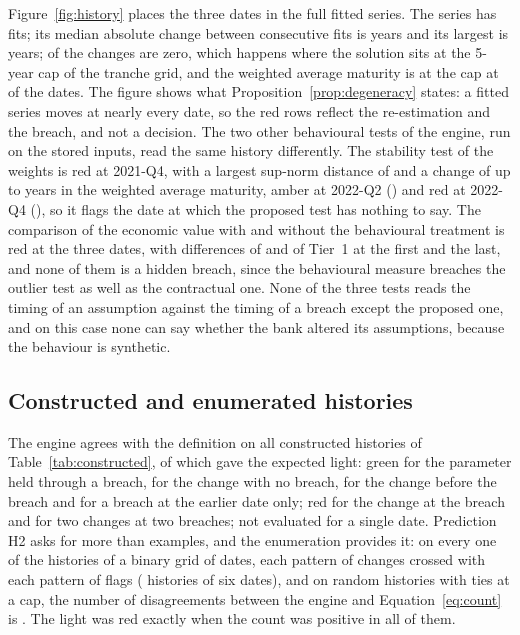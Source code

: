 Figure~\ref{fig:history} places the three dates in the full fitted series. The series has \realFits{} fits; its median absolute change between consecutive fits is \realMedianChange{} years and its largest is \realMaxChange{} years; \realZeroShare{} of the changes are zero, which happens where the solution sits at the 5-year cap of the tranche grid, and the weighted average maturity is at the cap at \realCapShare{} of the dates. The figure shows what Proposition~\ref{prop:degeneracy} states: a fitted series moves at nearly every date, so the red rows reflect the re-estimation and the breach, and not a decision. The two other behavioural tests of the engine, run on the stored inputs, read the same history differently. The stability test of the weights is red at 2021-Q4, with a largest sup-norm distance of \cOneFourStabStatA{} and a change of up to \cOneFourStabYearsA{} years in the weighted average maturity, amber at 2022-Q2 (\cOneFourStabStatB{}) and red at 2022-Q4 (\cOneFourStabStatC{}), so it flags the date at which the proposed test has nothing to say. The comparison of the economic value with and without the behavioural treatment is red at the three dates, with differences of \cOneFourWwStatA{} and \cOneFourWwStatC{} of Tier~1 at the first and the last, and none of them is a hidden breach, since the behavioural measure breaches the outlier test as well as the contractual one. None of the three tests reads the timing of an assumption against the timing of a breach except the proposed one, and on this case none can say whether the bank altered its assumptions, because the behaviour is synthetic.

\subsection{Constructed and enumerated histories}
\label{sec:res-constructed}

The engine agrees with the definition on all \constructedN{} constructed histories of Table~\ref{tab:constructed}, of which \constructedAgree{} gave the expected light: green for the parameter held through a breach, for the change with no breach, for the change before the breach and for a breach at the earlier date only; red for the change at the breach and for two changes at two breaches; not evaluated for a single date. Prediction H2 asks for more than examples, and the enumeration provides it: on every one of the \gridTotal{} histories of a binary grid of \gridLengths{} dates, each pattern of changes crossed with each pattern of flags (\gridSix{} histories of six dates), and on \randomN{} random histories with ties at a cap, the number of disagreements between the engine and Equation~\eqref{eq:count} is \gridBad{}. The light was red exactly when the count was positive in all of them.

